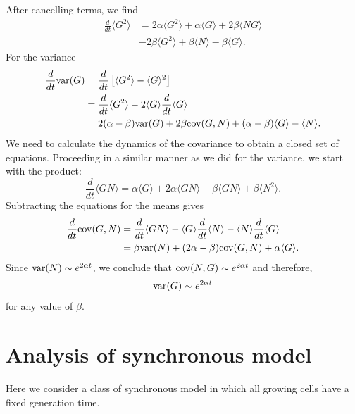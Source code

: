 \documentclass{article}
\begin{document}
After cancelling terms, we find
\begin{align}
\frac{d}{dt}\langle  G^2\rangle  &= 2 \alpha \langle G^2 \rangle  + \alpha \langle G \rangle + 2 \beta \langle N G \rangle \\
&- 2 \beta \langle G^2 \rangle  + \beta \langle N \rangle  - \beta \langle G\rangle. 
\end{align}
For the variance 
\begin{align}
\frac{d}{dt}{\rm var}(G) &= \frac{d}{dt} \left[\langle G^2 \rangle - \langle G \rangle^2 \right]\\
&= \frac{d}{dt} \langle G^2 \rangle  - 2\langle G \rangle \frac{d}{dt} \langle G \rangle\\
&= 2 (\alpha - \beta){\rm var}(G) + 2 \beta {\rm cov}(G,N) + (\alpha-\beta)\langle G \rangle  - \langle  N\rangle. 
\end{align} 
We need to calculate the dynamics of the covariance to obtain a closed set of equations. Proceeding in a similar manner as we did for the variance, we start with the product:
\begin{equation}
\frac{d}{dt}\langle G N \rangle  = \alpha \langle  G\rangle  + 2\alpha \langle G N \rangle  - \beta \langle G N \rangle  + \beta \langle N^2 \rangle. 
\end{equation}
Subtracting the equations for the means gives 
\begin{align}
\frac{d}{dt} {\rm cov}(G,N) &= \frac{d}{dt}\langle G N\rangle  - \langle G  \rangle \frac{d}{dt}\langle  N\rangle  -  \langle N  \rangle \frac{d}{dt}\langle  G\rangle\\
&= \beta {\rm var}(N) + (2\alpha - \beta){\rm cov}(G,N) + \alpha \langle G \rangle. 
\end{align}
Since ${\rm var}(N) \sim e^{2 \alpha t}$, we conclude that ${\rm cov}(N,G) \sim e^{2\alpha t}$ and therefore,  
\begin{equation}
{\rm var}(G) \sim e^{2\alpha t}
\end{equation}
for any value of $\beta$. 

\section{Analysis of synchronous model}\label{app:sync}
Here we consider a class of synchronous model in which all growing cells have a fixed generation time.  
\end{document}
